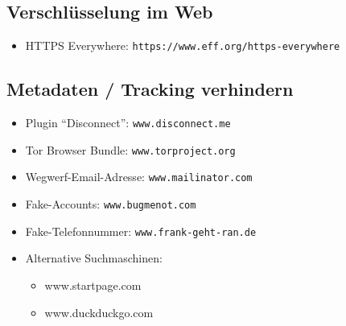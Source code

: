 \documentclass[a5paper]{scrartcl}
\begin{document}
\subsection*{Verschlüsselung im Web}
\begin{itemize}
  \item HTTPS Everywhere: \texttt{https://www.eff.org/https-everywhere}
\end{itemize}
\pagebreak
\subsection*{Metadaten / Tracking verhindern}
\begin{itemize}
  \item Plugin ``Disconnect'': \texttt{www.disconnect.me}
  \item Tor Browser Bundle: \texttt{www.torproject.org}
  \item Wegwerf-Email-Adresse: \texttt{www.mailinator.com}
  \item Fake-Accounts: \texttt{www.bugmenot.com}
  \item Fake-Telefonnummer: \texttt{www.frank-geht-ran.de}
  \item Alternative Suchmaschinen: 
    \begin{itemize}
      \item www.startpage.com 
      \item www.duckduckgo.com
    \end{itemize}
\end{itemize}
\end{document}
